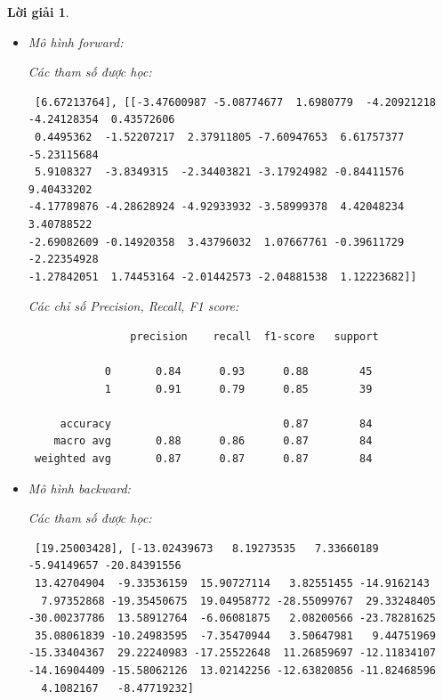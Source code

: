\documentclass[14pt, a4paper]{article}
\theoremstyle{sltheorem}
\theoremstyle{soltheorem}
\newtheorem*{loigiai}{Lời giải}
\begin{document}
\begin{loigiai}
\begin{itemize}
\begin{verbatim}
     accuracy                           0.83        84
    macro avg       0.85      0.83      0.83        84
 weighted avg       0.84      0.83      0.83        84
        \end{verbatim}

        \item Mô hình forward:
        
        Các tham số được học:

        \begin{verbatim}
 [6.67213764], [[-3.47600987 -5.08774677  1.6980779  -4.20921218 -4.24128354  0.43572606
 0.4495362  -1.52207217  2.37911805 -7.60947653  6.61757377 -5.23115684
 5.9108327  -3.8349315  -2.34403821 -3.17924982 -0.84411576  9.40433202
-4.17789876 -4.28628924 -4.92933932 -3.58999378  4.42048234  3.40788522
-2.69082609 -0.14920358  3.43796032  1.07667761 -0.39611729 -2.22354928
-1.27842051  1.74453164 -2.01442573 -2.04881538  1.12223682]]
        \end{verbatim}

        Các chỉ số Precision, Recall, F1 score:
        
        \begin{verbatim}
                precision    recall  f1-score   support

            0       0.84      0.93      0.88        45
            1       0.91      0.79      0.85        39
 
     accuracy                           0.87        84
    macro avg       0.88      0.86      0.87        84
 weighted avg       0.87      0.87      0.87        84
        \end{verbatim}

        \item Mô hình backward:
        
        Các tham số được học:

        \begin{verbatim}
 [19.25003428], [-13.02439673   8.19273535   7.33660189  -5.94149657 -20.84391556
 13.42704904  -9.33536159  15.90727114   3.82551455 -14.9162143
  7.97352868 -19.35450675  19.04958772 -28.55099767  29.33248405
-30.00237786  13.58912764  -6.06081875   2.08200566 -23.78281625
 35.08061839 -10.24983595  -7.35470944   3.50647981   9.44751969
-15.33404367  29.22240983 -17.25522648  11.26859697 -12.11834107
-14.16904409 -15.58062126  13.02142256 -12.63820856 -11.82468596
  4.1082167   -8.47719232]
        \end{verbatim}


\end{itemize}
\end{loigiai}
\end{document}
